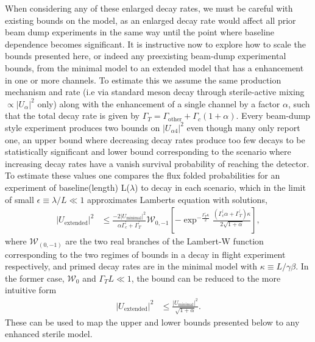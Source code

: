 \documentclass[11pt, a4paper]{article}
\begin{document}
When considering any of these enlarged decay rates, we must be careful with
existing bounds on the model, as an enlarged decay rate would affect all prior
beam dump experiments in the same way until the point where baseline dependence
becomes significant. It is instructive now to explore how to scale the bounds
presented here, or indeed any preexisting beam-dump experimental bounds, from
the minimal model to an extended model that has a enhancement in one or more
channels. To estimate this we assume the same production mechanism and rate
(i.e via standard meson decay through sterile-active mixing $\propto
|U_{\alpha}|^2$ only) along with the enhancement of a single channel by a
factor $\alpha$, such that the total decay rate is given by $\Gamma_T =
\Gamma_\text{other}+\Gamma_c (1+\alpha)$. Every beam-dump style experiment
produces two bounds on $|U_{\alpha 4}|^2$ even though many only report one, an
upper bound where decreasing decay rates produce too few decays to be
statistically significant and lower bound corresponding to the scenario where
increasing decay rates have a vanish survival probability of reaching the
detector. To estimate these values one compares the flux folded probabilities
for an experiment of baseline(length) L($\lambda$) to decay in each scenario,
which in the limit of small $\epsilon \equiv \lambda/L \ll 1$ approximates
Lamberts equation with solutions, \begin{align*} |U_\text{extended}|^2 &\leq
\frac{-2 |U_\text{minimal}|^2}{\alpha \Gamma^\prime_c +\Gamma^\prime_T}
\mathcal{W}_{0,-1}\left[-\exp^{-\frac{\Gamma^\prime_T \kappa}{2}}
\frac{(\Gamma^\prime_c \alpha + \Gamma^\prime_T)\kappa}{2\sqrt{1+\alpha}}
\right], \end{align*} where $\mathcal{W}_{(0,-1)}$ are the two real branches of
the Lambert-W function corresponding to the two regimes of bounds in a decay in
flight experiment respectively, and primed decay rates are in the minimal model
with $\kappa \equiv L/\gamma \beta$. In the former case, $\mathcal{W}_0$ and
$\Gamma_T L \ll 1$, the bound can be reduced to the more intuitive form
\begin{align*} |U_\text{extended}|^2 &\leq
\frac{|U_{\text{minimal}}|^2}{\sqrt{1+\alpha}}.  \end{align*} These can be used
to map the upper and lower bounds presented below to any enhanced sterile
model.\\
\end{document}

